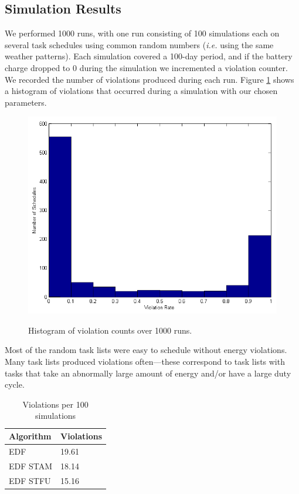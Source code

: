 \subsection{Simulation Results}
We performed 1000 runs, with one run consisting of 100 simulations each on several task schedules using common random numbers (\emph{i.e.} using the same weather patterns).  Each simulation covered a 100-day period, and if the battery charge dropped to 0 during the simulation we incremented a violation counter.  We recorded the number of violations produced during each run.  Figure \ref{fig:violationhist} shows a histogram of violations that occurred during a simulation with our chosen parameters.
\begin{figure}[h]
\includegraphics[scale=0.5]{violationhistogram.png}
\label{fig:violationhist}
\caption{Histogram of violation counts over 1000 runs.}
\end{figure}
Most of the random task lists were easy to schedule without energy violations.  Many task lists produced violations often---these correspond to task lists with tasks that take an abnormally large amount of energy and/or have a large duty cycle.
\begin{table}[h]
\begin{center}
\begin{tabular}{| l | l |}
\hline
\textbf{Algorithm} & \textbf{Violations} \\
\hline
EDF & 19.61 \\
EDF STAM & 18.14 \\		%
EDF STFU & 15.16 \\
\hline
\end{tabular}
\end{center}
\label{tab:simresults}
\caption{Violations per 100 simulations}
\end{table}
